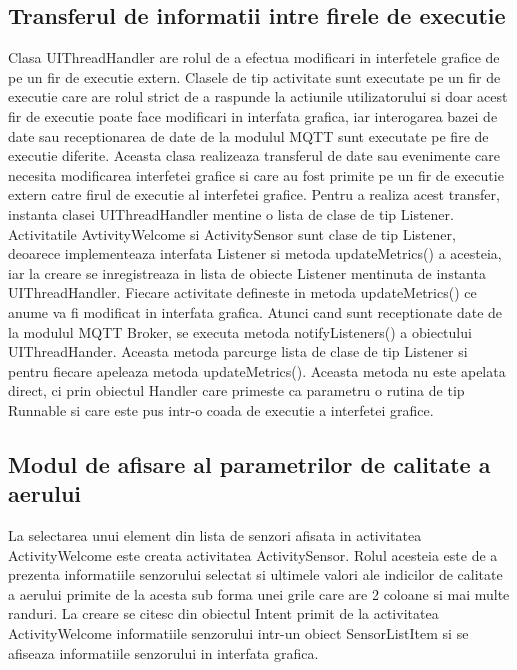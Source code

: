 \subsection{Transferul de informatii intre firele de executie}\label{subsec:pi_appandroid_transfer_info_threads}
Clasa UIThreadHandler are rolul de a efectua modificari in interfetele grafice de pe un fir de executie extern. Clasele de tip activitate sunt executate pe un fir de executie 
care are rolul strict de a raspunde la actiunile utilizatorului si doar acest fir de executie poate face modificari in interfata grafica, iar interogarea bazei de date sau 
receptionarea de date de la modulul MQTT sunt executate pe fire de executie diferite. Aceasta clasa realizeaza transferul de date sau evenimente care necesita modificarea 
interfetei grafice si care au fost primite pe un fir de executie extern catre firul de executie al interfetei grafice. Pentru a realiza acest transfer, instanta clasei  
UIThreadHandler mentine o lista de clase de tip Listener. Activitatile AvtivityWelcome si ActivitySensor sunt clase de tip Listener, deoarece implementeaza interfata 
Listener si metoda updateMetrics() a acesteia, iar la creare se inregistreaza in lista de obiecte Listener mentinuta de instanta UIThreadHandler. Fiecare activitate 
defineste in metoda updateMetrics() ce anume va fi modificat in interfata grafica. Atunci cand sunt receptionate date de la modulul MQTT Broker, se executa metoda 
notifyListeners() a obiectului UIThreadHander. Aceasta metoda parcurge lista de clase de tip Listener si pentru fiecare apeleaza metoda updateMetrics(). Aceasta metoda nu este 
apelata direct, ci prin obiectul Handler care primeste ca parametru o rutina de tip Runnable si care este pus intr-o coada de executie a interfetei grafice.

\subsection{Modul de afisare al parametrilor de calitate a aerului}\label{subsec:pi_appandroid_afisare_parametrii_aqi}
La selectarea unui element din lista de senzori afisata in activitatea ActivityWelcome este creata activitatea ActivitySensor. Rolul acesteia este de a prezenta informatiile 
senzorului selectat si ultimele valori ale indicilor de calitate a aerului primite de la acesta sub forma unei grile care are 2 coloane si mai multe randuri. La creare 
se citesc din obiectul Intent primit de la activitatea ActivityWelcome informatiile senzorului intr-un obiect SensorListItem si se afiseaza informatiile senzorului in 
interfata grafica. 

